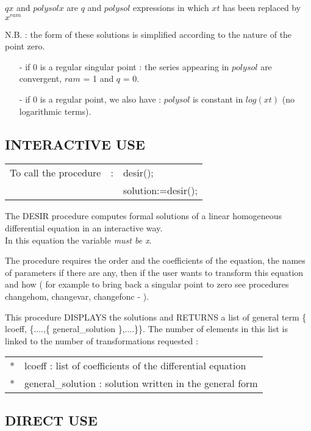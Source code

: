 $qx$ and $polysolx$ are $q$ and $polysol$ expressions in which $xt$ has been
replaced by $x^{ram}$

N.B. : the form of these solutions is simplified according to the nature of
the point zero.
\begin{itemize}
\item[-] if 0 is a regular singular point : the series appearing in $polysol$ are
         convergent, $ram$ = 1 and $q$ = 0.
\item[-] if 0 is a regular point, we also have : $polysol$ is constant in $log(xt)$
         (no logarithmic terms).
\end{itemize}

\subsection{INTERACTIVE USE}

\begin{tabular}{lcl}
To call the procedure & : & desir(); \\
                      &   & solution:=desir();
\end{tabular}

The DESIR procedure computes formal solutions of a linear homogeneous
differential equation in an interactive way. \\
In this equation the variable \emph{must be x}. 

The procedure requires the order and the coefficients of the equation, the
names of parameters if there are any, then if the user wants to transform
this equation and how ( for example to bring back a singular point to zero
see procedures changehom, changevar, changefonc - ). \par
This procedure DISPLAYS the solutions and RETURNS a list of general term
\{ lcoeff, \{....,\{ general\_solution \},....\}\}. The number of elements in
this list is linked to the number of transformations requested : \\
\begin{tabular}{rl}
{*} & lcoeff : list of coefficients of the differential equation \\
{*} & general\_solution : solution written in the general form 
\end{tabular}

\subsection{DIRECT USE}

